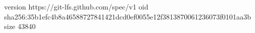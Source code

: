 version https://git-lfs.github.com/spec/v1
oid sha256:35b1efc4b8a46588727841421dcd0ef0055e12f3813870061236073f0101aa3b
size 43840
